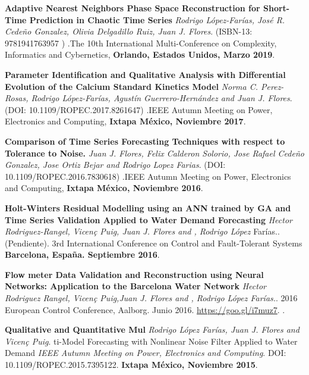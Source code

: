 \documentclass[10pt]{article}
\newenvironment{innerlist}[1][\enskip\textbullet]%
        {\begin{compactitem}[#1]}{\end{compactitem}}
\newcommand{\blankline}{\quad\pagebreak[2]}
\begin{document}
\blankline
\begin{innerlist}

\item \textbf{Adaptive Nearest Neighbors Phase Space Reconstruction for Short-Time Prediction in Chaotic Time Series} \textit{Rodrigo López-Farías, José R. Cedeño Gonzalez, Olivia Delgadillo Ruiz, Juan J. Flores}. (ISBN-13: 9781941763957 ) .{The 10th International Multi-Conference on Complexity, Informatics and Cybernetics}, \textbf{Orlando, Estados Unidos, Marzo 2019}.


\item \textbf{Parameter Identification and Qualitative Analysis with Differential Evolution of the Calcium Standard Kinetics Model} \textit{Norma C. Perez-Rosas, Rodrigo López-Farías, Agustín Guerrero-Hernández and Juan J. Flores}. (DOI: 10.1109/ROPEC.2017.8261647) .{IEEE Autumn Meeting on Power, Electronics and Computing}, \textbf{Ixtapa México, Noviembre 2017}.


\item \textbf{Comparison of Time Series Forecasting Techniques with respect to Tolerance to Noise.} \textit{Juan J. Flores, Felix Calderon Solorio, Jose Rafael Cede\~no Gonzalez, Jose Ortiz Bejar and Rodrigo Lopez Farias}. (DOI: 10.1109/ROPEC.2016.7830618) .{IEEE Autumn Meeting on Power, Electronics and Computing}, \textbf{Ixtapa México, Noviembre 2016}.


\item \textbf{Holt-Winters Residual Modelling using an ANN trained by GA and Time Series Validation Applied to Water Demand Forecasting} \textit{Hector Rodriguez-Rangel, Vicen\c{c} Puig, Juan J. Flores and ,  Rodrigo López} Farías.. (Pendiente). {3rd International Conference on Control and Fault-Tolerant Systems} \textbf{Barcelona, España. Septiembre 2016}.

\item \textbf{Flow meter Data Validation and Reconstruction using Neural Networks: Application to the Barcelona Water Network} \textit{Hector Rodriguez Rangel, Vicen\c{c} Puig,Juan J. Flores and ,  Rodrigo López Farías.}. 2016 European Control Conference, Aalborg. Junio 2016. \url{https://goo.gl/i7muz7}. .

\item \textbf{Qualitative and Quantitative Mul} \textit{Rodrigo López Farías, Juan J. Flores and Vicen\c{c} Puig}.  ti-Model Forecasting with Nonlinear Noise Filter Applied to Water Demand \textit{IEEE Autumn Meeting on Power, Electronics and Computing}. DOI: 10.1109/ROPEC.2015.7395122.  \textbf{Ixtapa México, Noviembre 2015}.


\end{innerlist}
\end{document}
